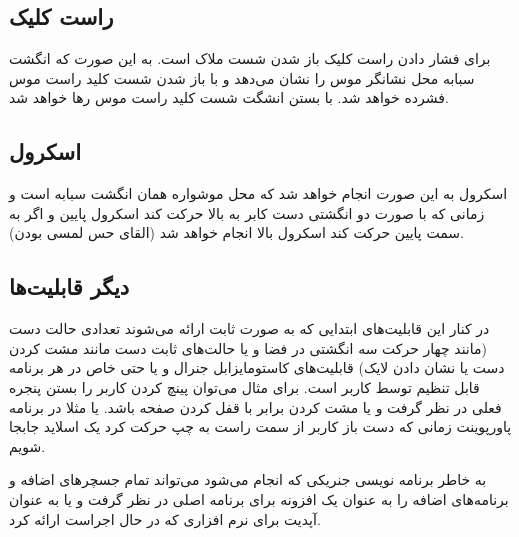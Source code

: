 \documentclass{article}
\begin{document}
 

\subsection{راست کلیک}
برای فشار دادن راست کلیک باز شدن شست ملاک است. به این صورت که انگشت سبابه محل نشانگر موس را نشان می‌دهد و با باز شدن شست کلید راست موس فشرده خواهد شد. با بستن انشگت شست کلید راست موس رها خواهد شد.

\subsection{اسکرول}
اسکرول به این صورت انجام خواهد شد که محل موشواره همان انگشت سبابه است و زمانی که با صورت دو انگشتی دست کابر به بالا حرکت کند اسکرول پایین و اگر به سمت پایین حرکت کند اسکرول بالا انجام خواهد شد (القای حس لمسی بودن).

\subsection{دیگر قابلیت‌ها}
در کنار این قابلیت‌های ابتدایی  که به صورت ثابت ارائه می‌شوند تعدادی حالت دست (مانند چهار حرکت سه انگشتی در فضا و یا حالت‌های ثابت دست مانند مشت کردن دست یا نشان دادن لایک) قابلیت‌های کاستومایزابل جنرال و یا حتی خاص در هر برنامه قابل تنظیم توسط کاربر است. برای مثال می‌توان پینچ کردن کاربر را بستن پنجره فعلی در نظر گرفت و یا مشت کردن برابر با قفل کردن صفحه باشد. یا مثلا در برنامه پاورپوینت زمانی که دست باز کاربر از سمت راست به چپ حرکت کرد یک اسلاید جابجا شویم.

به خاطر برنامه نویسی جنریکی که انجام می‌شود می‌تواند تمام جسچرهای اضافه و برنامه‌های  اضافه را به عنوان یک افزونه برای برنامه  اصلی در نظر گرفت و یا به عنوان آپدیت برای نرم افزاری که در حال اجراست ارائه کرد.
\end{document}
